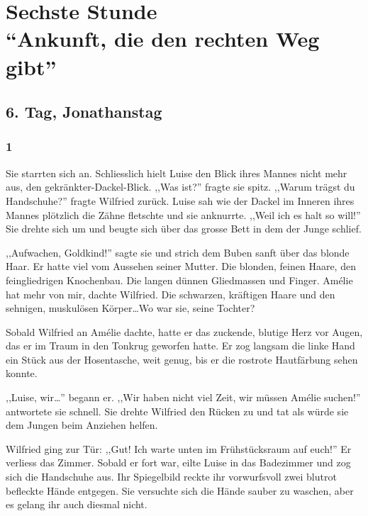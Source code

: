 \part*{Sechste Stunde\\"`Ankunft, die den rechten Weg gibt"'}

\chapter*{6. Tag, Jonathanstag}

\section*{1}

Sie starrten sich an. Schliesslich hielt Luise den Blick ihres Mannes nicht mehr aus, den gekränkter-Dackel-Blick. ,,Was ist?'' fragte sie spitz. ,,Warum trägst du Handschuhe?'' fragte Wilfried zurück. Luise sah wie der Dackel im Inneren ihres Mannes  plötzlich die Zähne fletschte und sie anknurrte. ,,Weil ich es halt so will!'' Sie drehte sich um und beugte sich über das grosse Bett in dem der Junge schlief. 

,,Aufwachen, Goldkind!'' sagte sie und strich dem Buben sanft über das blonde Haar. Er hatte viel vom Aussehen seiner Mutter. Die blonden, feinen Haare, den feingliedrigen Knochenbau. Die langen dünnen Gliedmassen und Finger. Amélie hat mehr von mir, dachte Wilfried. Die schwarzen, kräftigen Haare und den sehnigen, muskulösen Körper\dots Wo war sie, seine Tochter? 

Sobald Wilfried an Amélie dachte, hatte er das zuckende, blutige Herz vor Augen, das er im Traum in den Tonkrug geworfen hatte. Er zog langsam die linke Hand ein Stück aus der Hosentasche, weit genug, bis er die rostrote Hautfärbung sehen konnte.

,,Luise, wir\dots '' begann er. ,,Wir haben nicht viel Zeit, wir müssen Amélie suchen!'' antwortete sie schnell. Sie drehte Wilfried den Rücken zu und tat als würde sie dem Jungen beim Anziehen helfen. 

Wilfried ging zur Tür: ,,Gut! Ich warte unten im Frühstücksraum auf euch!'' Er verliess das Zimmer. Sobald er fort war, eilte Luise in das Badezimmer und zog sich die Handschuhe aus. Ihr Spiegelbild reckte ihr vorwurfsvoll zwei blutrot befleckte Hände entgegen. Sie versuchte sich die Hände sauber zu waschen, aber es gelang ihr auch diesmal nicht. 

